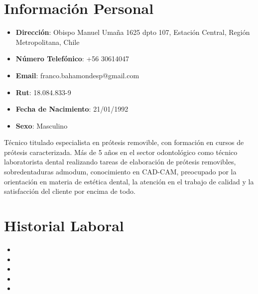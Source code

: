 \documentclass[11pt,a4paper,roman]{moderncv}        %
\begin{document}
\makecvtitle
\vspace*{-10mm}

\section{Información Personal}

\begin{itemize}

\item{\textbf{Dirección}: Obispo Manuel Umaña 1625 dpto 107, Estación Central, Región Metropolitana, Chile}

\item{\textbf{Número Telefónico}: +56 30614047}

\item{\textbf{Email}: franco.bahamondesp@gmail.com}

\item{\textbf{Rut}: 18.084.833-9}

\item{\textbf{Fecha de Nacimiento}: 21/01/1992}

\item{\textbf{Sexo}: Masculino}\\

\end{itemize}

\small{ Técnico titulado especialista en prótesis removible, con formación en cursos de prótesis caracterizada. Más de 5 años en el sector odontológico como técnico laboratorista dental realizando tareas de elaboración de prótesis removibles, sobredentaduras admodum, conocimiento en CAD-CAM, preocupado por la orientación en materia de estética dental, la atención en el trabajo de calidad y la satisfacción del cliente por encima de todo.}


\section{Historial Laboral}
\begin{itemize}
\item{}
\vspace{3pt}
\item{}
\vspace{3pt}
\item{}
\item{}
\item {}
\end{itemize}
\end{document}
